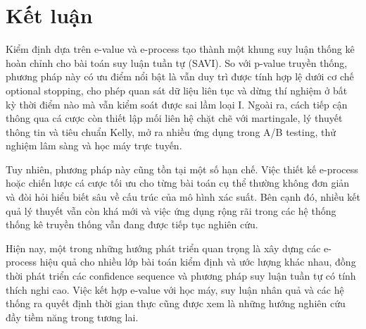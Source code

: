 \section{Kết luận}

Kiểm định dựa trên e-value và e-process tạo thành một khung suy luận
thống kê hoàn chỉnh cho bài toán suy luận tuần tự (SAVI). So với
p-value truyền thống, phương pháp này có ưu điểm nổi bật là vẫn duy
trì được tính hợp lệ dưới cơ chế optional stopping, cho phép quan sát
dữ liệu liên tục và dừng thí nghiệm ở bất kỳ thời điểm nào mà vẫn kiểm
soát được sai lầm loại I. Ngoài ra, cách tiếp cận thông qua cá cược còn
thiết lập mối liên hệ chặt chẽ với martingale, lý thuyết thông tin và
tiêu chuẩn Kelly, mở ra nhiều ứng dụng trong A/B testing, thử nghiệm
lâm sàng và học máy trực tuyến.

Tuy nhiên, phương pháp này cũng tồn tại một số hạn chế. Việc thiết kế
e-process hoặc chiến lược cá cược tối ưu cho từng bài toán cụ thể
thường không đơn giản và đòi hỏi hiểu biết sâu về cấu trúc của mô hình
xác suất. Bên cạnh đó, nhiều kết quả lý thuyết vẫn còn khá mới và việc
ứng dụng rộng rãi trong các hệ thống thống kê truyền thống vẫn đang
được tiếp tục nghiên cứu.

Hiện nay, một trong những hướng phát triển quan trọng là xây dựng các
e-process hiệu quả cho nhiều lớp bài toán kiểm định và ước lượng khác
nhau, đồng thời phát triển các confidence sequence và phương pháp
suy luận tuần tự có tính thích nghi cao. Việc kết hợp e-value với học
máy, suy luận nhân quả và các hệ thống ra quyết định thời gian thực
cũng được xem là những hướng nghiên cứu đầy tiềm năng trong tương lai.
